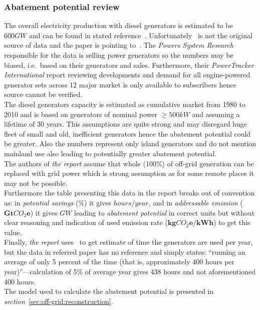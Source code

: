 \documentclass[11pt, twocolumn]{article}
\begin{document}
\subsubsection{Abatement potential review}
The overall electricity production with diesel generators is estimated to be $600 GW$ and can be found in stated reference~\citep{pieper2011revisiting}. Unfortunately~\citep{pieper2011revisiting} is not the original source of data and the paper is pointing to~\citep{PowersSystemResearch}. The \emph{Powers System Research} responsible for the data is selling power generators so the numbers may be biased, i.e.\ based on their generators and sales. Furthermore, their \emph{PowerTracker International} report reviewing developments and demand for all engine-powered generator sets across 12 major market is only available to subscribers hence source cannot be verified.\\
The diesel generators capacity is estimated as cumulative market from 1980 to 2010 and is based on generators of nominal power $\geq 500kW$ and assuming a lifetime of 30 years. This assumptions are quite strong and may disregard huge fleet of small and old, inefficient generators hence the abatement potential could be greater. Also the numbers represent only island generators and do not mention mainland use also leading to potentially greater abatement potential.\\
The authors of \emph{the report} assume that whole (100\%) of off-grid generation can be replaced with grid power which is strong assumption as for some remote places it may not be possible.\\
Furthermore the table presenting this data in the report breaks out of convention as: in \emph{potential savings} (\%) it gives $hours/year$, and in \emph{addressable emission} ($\mathbf{Gt}CO_2\mathbf{e}$) it gives $GW$ leading to \emph{abatement potential} in correct units but without clear reasoning and indication of used emission rate ($\mathbf{kg}CO_2\mathbf{e}/\mathbf{kWh}$) to get this value.\\
Finally, \emph{the report} uses~\citep{pieper2011revisiting} to get estimate of time the generators are used per year, but the data in referred paper has no reference and simply states: ``running an average of only 5 percent of the time (that is, approximately 400 hours per year)''---calculation of 5\% of average year gives 438 hours and not aforementioned 400 hours.\\
The model used to calculate the abatement potential is presented in \emph{section}~\ref{sec:off-grid:reconstruction}.\\
\end{document}
